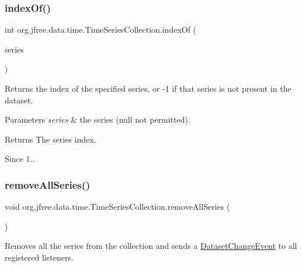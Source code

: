 \subsubsection{\texorpdfstring{index\+Of()}{indexOf()}}
{\footnotesize\ttfamily int org.\+jfree.\+data.\+time.\+Time\+Series\+Collection.\+index\+Of (\begin{DoxyParamCaption}\item[{\mbox{\hyperlink{classorg_1_1jfree_1_1data_1_1time_1_1_time_series}{Time\+Series}}}]{series }\end{DoxyParamCaption})}

Returns the index of the specified series, or -\/1 if that series is not present in the dataset.


\begin{DoxyParams}{Parameters}
{\em series} & the series ({\ttfamily null} not permitted).\\
\hline
\end{DoxyParams}
\begin{DoxyReturn}{Returns}
The series index.
\end{DoxyReturn}
\begin{DoxySince}{Since}
1.. 
\end{DoxySince}
\mbox{\label{classorg_1_1jfree_1_1data_1_1time_1_1_time_series_collection_a02bb15c83e3d33a709e5bd8f6ad8a80e}} 
\subsubsection{\texorpdfstring{remove\+All\+Series()}{removeAllSeries()}}
{\footnotesize\ttfamily void org.\+jfree.\+data.\+time.\+Time\+Series\+Collection.\+remove\+All\+Series (\begin{DoxyParamCaption}{ }\end{DoxyParamCaption})}

Removes all the series from the collection and sends a \mbox{\hyperlink{}{Dataset\+Change\+Event}} to all registered listeners. \mbox{\label{classorg_1_1jfree_1_1data_1_1time_1_1_time_series_collection_a51747c5cbd2316e25938f297d51ded67}} 
